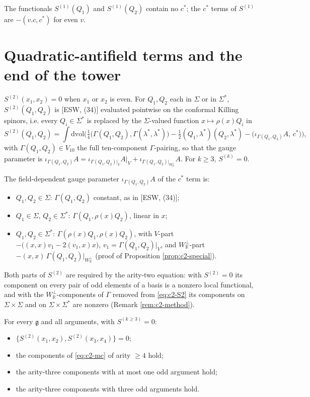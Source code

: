 The functionals $S^{(1)}(Q_1)$ and $S^{(1)}(Q_2)$ contain no $c^*$; the $c^*$ terms of $S^{(1)}$ are $-(v.c,c^*)$ for even $v$.

\section{Quadratic-antifield terms and the end of the tower}

\begin{definition}
\label{def:c2-S2}
$S^{(2)}(x_1,x_2)=0$ when $x_1$ or $x_2$ is even. For $Q_1,Q_2$ each in $\Sigma$ or in $\Sigma^*$, $S^{(2)}(Q_1,Q_2)$ is [ESW, (34)] evaluated pointwise on the conformal Killing spinors, i.e. every $Q_i\in\Sigma^*$ is replaced by the $\Sigma$-valued function $x\mapsto\rho(x)Q_i$ in
\begin{equation}
S^{(2)}(Q_1,Q_2)=\int\mathrm{dvol}\Big(\tfrac14\big(\Gamma(Q_1,Q_2),\Gamma(\lambda^*,\lambda^*)\big)-\tfrac12(Q_1,\lambda^*)(Q_2,\lambda^*)-\big(\iota_{\Gamma(Q_1,Q_2)}A,\,c^*\big)\Big),
\label{eq:c2-S2}
\end{equation}
with $\Gamma(Q_1,Q_2)\in V_{10}$ the full ten-component $\Gamma$-pairing, so that the gauge parameter is $\iota_{\Gamma(Q_1,Q_2)}A=\iota_{\Gamma(Q_1,Q_2)|_V}A|_V+\iota_{\Gamma(Q_1,Q_2)|_{W_{\mathbb R}^\perp}}A$. For $k\ge3$, $S^{(k)}=0$.
\end{definition}

The field-dependent gauge parameter $\iota_{\Gamma(Q_1,Q_2)}A$ of the $c^*$ term is:
\begin{itemize}
\item $Q_1,Q_2\in\Sigma$: $\Gamma(Q_1,Q_2)$ constant, as in [ESW, (34)];
\item $Q_1\in\Sigma$, $Q_2\in\Sigma^*$: $\Gamma(Q_1,\rho(x)Q_2)$, linear in $x$;
\item $Q_1,Q_2\in\Sigma^*$: $\Gamma(\rho(x)Q_1,\rho(x)Q_2)$, with $V$-part $-\big((x,x)v_1-2(v_1,x)x\big)$, $v_1=\Gamma(Q_1,Q_2)|_V$, and $W_{\mathbb R}^\perp$-part $-(x,x)\,\Gamma(Q_1,Q_2)|_{W_{\mathbb R}^\perp}$ (proof of Proposition \ref{prop:c2-special}).
\end{itemize}
Both parts of $S^{(2)}$ are required by the arity-two equation: with $S^{(2)}=0$ its component on every pair of odd elements of a basis is a nonzero local functional, and with the $W_{\mathbb R}^\perp$-components of $\Gamma$ removed from \eqref{eq:c2-S2} its components on $\Sigma\times\Sigma$ and on $\Sigma\times\Sigma^*$ are nonzero (Remark \ref{rem:c2-method}).

\begin{proposition}
\label{prop:c2-tower}
For every $\mathfrak g$ and all arguments, with $S^{(k\ge3)}=0$:
\begin{itemize}
\item $\{S^{(2)}(x_1,x_2),S^{(2)}(x_3,x_4)\}=0$;
\item the components of \eqref{eq:c2-mc} of arity $\ge4$ hold;
\item the arity-three components with at most one odd argument hold;
\item the arity-three components with three odd arguments hold.
\end{itemize}
\end{proposition}

